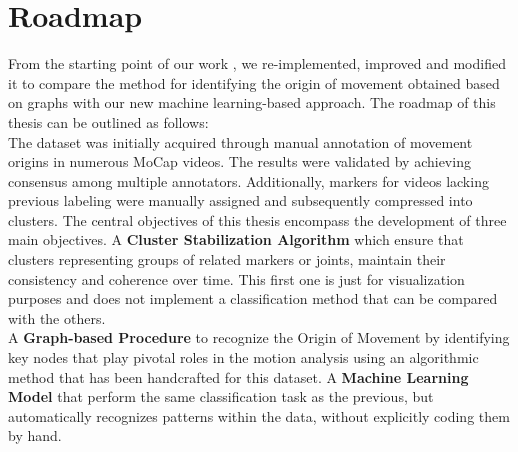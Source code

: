 \section{Roadmap}
From the starting point of our work \cite{kolykhalova:2020}, we re-implemented, improved and modified it to compare the method for identifying the origin of movement obtained based on graphs with our new machine learning-based approach.
The roadmap of this thesis can be outlined as follows: \\
The dataset was initially acquired through manual annotation of movement origins in numerous MoCap videos. 
The results were validated by achieving consensus among multiple annotators. 
Additionally, markers for videos lacking previous labeling were manually assigned and subsequently compressed into clusters.
The central objectives of this thesis encompass the development of three main objectives.
A \textbf{Cluster Stabilization Algorithm} which ensure that clusters representing groups of related markers or joints, maintain their consistency and coherence over time.
This first one is just for visualization purposes and does not implement a classification method that can be compared with the others.\\
A \textbf{Graph-based Procedure} to recognize the Origin of Movement by identifying key nodes that play pivotal roles in the motion analysis using an algorithmic method that has been handcrafted for this dataset.
A \textbf{Machine Learning Model} that perform the same classification task as the previous, but automatically recognizes patterns within the data, without explicitly coding them by hand.

